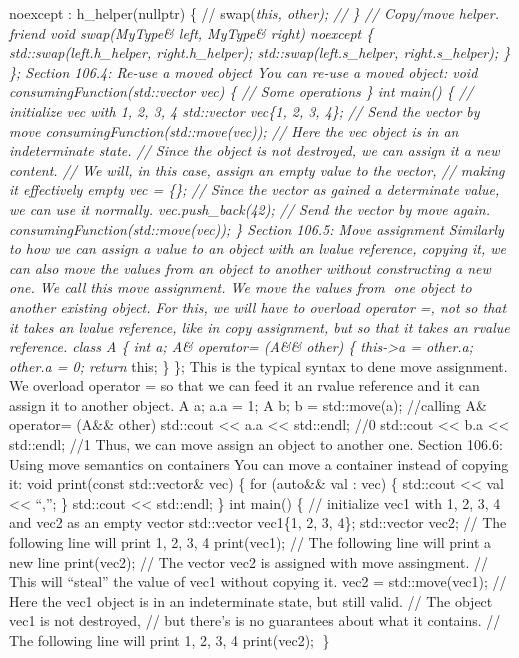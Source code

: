 noexcept : h\_helper(nullptr) \{ // swap(\emph{this, other); // \} //
Copy/move helper. friend void swap(MyType\& left, MyType\& right)
noexcept \{ std::swap(left.h\_helper, right.h\_helper);
std::swap(left.s\_helper, right.s\_helper); \} \}; Section 106.4: Re-use
a moved object You can re-use a moved object: void
consumingFunction(std::vector vec) \{ // Some operations \} int main()
\{ // initialize vec with 1, 2, 3, 4 std::vector vec\{1, 2, 3, 4\}; //
Send the vector by move consumingFunction(std::move(vec)); // Here the
vec object is in an indeterminate state. // Since the object is not
destroyed, we can assign it a new content. // We will, in this case,
assign an empty value to the vector, // making it effectively empty vec
= \{\}; // Since the vector as gained a determinate value, we can use it
normally. vec.push\_back(42); // Send the vector by move again.
consumingFunction(std::move(vec)); \} Section 106.5: Move assignment
Similarly to how we can assign a value to an object with an lvalue
reference, copying it, we can also move the values from an object to
another without constructing a new one. We call this move assignment. We
move the values from one object to another existing object. For this,
we will have to overload operator =, not so that it takes an lvalue
reference, like in copy assignment, but so that it takes an rvalue
reference. class A \{ int a; A\& operator= (A\&\& other) \{
this-\textgreater a = other.a; other.a = 0; return }this; \} \}; This is
the typical syntax to dene move assignment. We overload operator = so
that we can feed it an rvalue reference and it can assign it to another
object. A a; a.a = 1; A b; b = std::move(a); //calling A\& operator=
(A\&\& other) std::cout \textless\textless{} a.a \textless\textless{}
std::endl; //0 std::cout \textless\textless{} b.a \textless\textless{}
std::endl; //1 Thus, we can move assign an object to another one.
Section 106.6: Using move semantics on containers You can move a
container instead of copying it: void print(const std::vector\& vec) \{
for (auto\&\& val : vec) \{ std::cout \textless\textless{} val
\textless\textless{} ``,''; \} std::cout \textless\textless{} std::endl;
\} int main() \{ // initialize vec1 with 1, 2, 3, 4 and vec2 as an empty
vector std::vector vec1\{1, 2, 3, 4\}; std::vector vec2; // The
following line will print 1, 2, 3, 4 print(vec1); // The following line
will print a new line print(vec2); // The vector vec2 is assigned with
move assingment. // This will ``steal'' the value of vec1 without
copying it. vec2 = std::move(vec1); // Here the vec1 object is in an
indeterminate state, but still valid. // The object vec1 is not
destroyed, // but there's is no guarantees about what it contains. //
The following line will print 1, 2, 3, 4 print(vec2); \}
